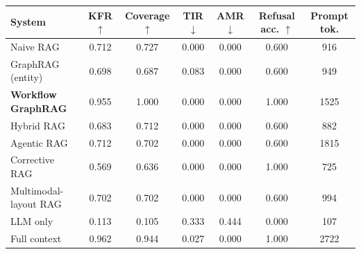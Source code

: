 \begin{tabular}{lcccccc}
\toprule
System & KFR $\uparrow$ & Coverage $\uparrow$ & TIR $\downarrow$ & AMR $\downarrow$ & Refusal acc. $\uparrow$ & Prompt tok. \\
\midrule
Naive RAG & 0.712 & 0.727 & 0.000 & 0.000 & 0.600 & 916 \\
GraphRAG (entity) & 0.698 & 0.687 & 0.083 & 0.000 & 0.600 & 949 \\
\textbf{Workflow GraphRAG} & 0.955 & 1.000 & 0.000 & 0.000 & 1.000 & 1525 \\
\midrule
Hybrid RAG & 0.683 & 0.712 & 0.000 & 0.000 & 0.600 & 882 \\
Agentic RAG & 0.712 & 0.702 & 0.000 & 0.000 & 0.600 & 1815 \\
Corrective RAG & 0.569 & 0.636 & 0.000 & 0.000 & 1.000 & 725 \\
Multimodal-layout RAG & 0.702 & 0.702 & 0.000 & 0.000 & 0.600 & 994 \\
\midrule
LLM only & 0.113 & 0.105 & 0.333 & 0.444 & 0.000 & 107 \\
Full context & 0.962 & 0.944 & 0.027 & 0.000 & 1.000 & 2722 \\
\bottomrule
\end{tabular}
